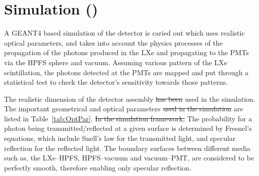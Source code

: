 \section{Simulation ()}
\label{sec:sim}
A GEANT4 based simulation of the detector is caried out which uses realistic optical parameters, and takes into account the physics processes of the propagation of the photons produced in the LXe and propagating to the PMTs via the HPFS sphere and vacuum.
Assuming various pattern of the LXe scintillation, the photons detected at the PMTs are mapped and put through a statistical test to check the detector's sensitivity towards those patterns.

The realistic dimension of the detector assembly \sout{has been}  used in the simulation. The important 
geometrical and optical parameters \sout{used in the simulation} are listed in Table~\ref{tab:OptPar}. 
\sout{In the simulation 
framework,} The probability for a photon being transmitted/reflected at a given surface is 
determined by Fresnel's equations, which include Snell's law for the transmitted light, 
and specular reflection for the reflected light. The boundary surfaces between different media
such as, the LXe--HPFS, HPFS--vacuum and vacuum--PMT, are  considered to be perfectly smooth, 
therefore enabling only specular reflection.

